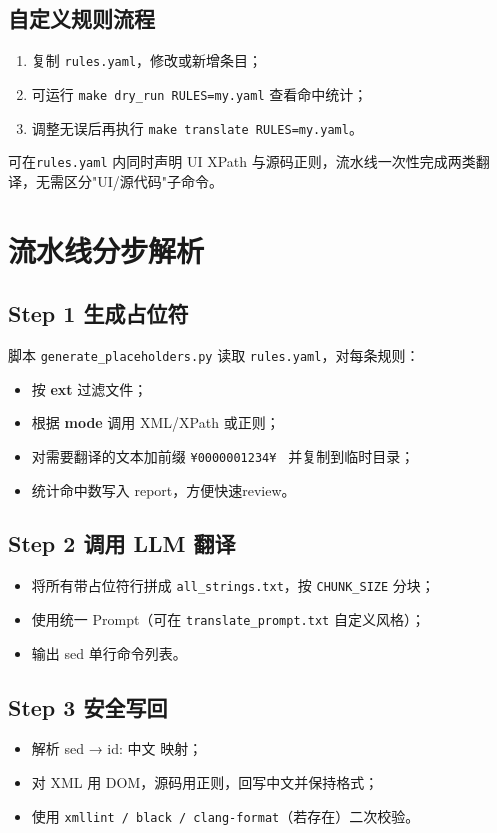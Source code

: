 \documentclass[12pt]{article}
\begin{document}
\subsection{自定义规则流程}
\begin{enumerate}
  \item 复制 \texttt{rules.yaml}，修改或新增条目；
  \item 可运行 \lstinline|make dry_run RULES=my.yaml| 查看命中统计；
  \item 调整无误后再执行 \lstinline|make translate RULES=my.yaml|。
\end{enumerate}

可在\texttt{rules.yaml} 内同时声明 UI XPath 与源码正则，流水线一次性完成两类翻译，无需区分"UI/源代码"子命令。

\section{流水线分步解析}
\subsection{Step 1 生成占位符}
脚本 \texttt{generate\_placeholders.py} 读取 \texttt{rules.yaml}，对每条规则：
\begin{itemize}
  \item 按 \textbf{ext} 过滤文件；
  \item 根据 \textbf{mode} 调用 XML/XPath 或正则；
  \item 对需要翻译的文本加前缀 \verb|¥0000001234¥ | 并复制到临时目录；
  \item 统计命中数写入 report，方便快速review。
\end{itemize}

\subsection{Step 2 调用 LLM 翻译}
\begin{itemize}
  \item 将所有带占位符行拼成 \texttt{all\_strings.txt}，按 \texttt{CHUNK\_SIZE} 分块；
  \item 使用统一 Prompt（可在 \texttt{translate\_prompt.txt} 自定义风格）；
  \item 输出 sed 单行命令列表。
\end{itemize}

\subsection{Step 3 安全写回}
\begin{itemize}
  \item 解析 sed → {id: 中文} 映射；
  \item 对 XML 用 DOM，源码用正则，回写中文并保持格式；
  \item 使用 \texttt{xmllint / black / clang-format}（若存在）二次校验。
\end{itemize}
\end{document}

